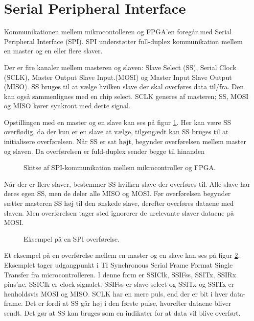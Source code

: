 \section{Serial Peripheral Interface}
\label{app:spi}
Kommunikationen mellem mikrocontolleren og FPGA’en foregår med Serial Peripheral Interface (SPI). 
SPI understøtter full-duplex kommunikation mellem en master og en eller flere slaver.

Der er fire kanaler mellem masteren og slaven: Slave Select (SS), Serial Clock (SCLK), Master Output Slave Input.(MOSI) og Master Input Slave Output (MISO). SS bruges til at vælge hvilken slave der skal overføres data til/fra. Den kan også sammenlignes med en chip select. SCLK generes af masteren; SS, MOSI og MISO kører synkront med dette signal.

Opstillingen med en master og en slave kan ses på figur \ref{fig:SPImasterslave}. 
Her kan være SS overflødig, da der kun er en slave at vælge, tilgengædt kan SS bruges til at initialisere overførelsen. 
Når SS er sat højt, begynder overførelsen mellem master og slaven. Da overførelsen er fuld-duplex sender begge til hinanden 
\begin{figure}[!th]
\centering
\begin{tikzpicture}[scale=0.8]

\end{tikzpicture}
\caption[SPI protokol]{Skitse af SPI-kommunikation mellem mikrocontroller og FPGA.}
\label{fig:SPImasterslave}
\end{figure}

Når der er flere slaver, bestemmer SS hvilken slave der overføres til.
Alle slave har deres egen SS, men de deler alle MISO og MOSI. 
Før overførelsen begynder sætter masteren SS høj til den ønskede slave,
derefter overføres dataene med slaven.
Men overførelsen tager sted ignorerer de urelevante slaver dataene på MOSI.  



\begin{figure}[!th]
\centering
\begin{tikzpicture}[scale=0.8]

\end{tikzpicture}
\caption[SPI overførelse]{Eksempel på en SPI overførelse.}
\label{fig:SPIfigur}
\end{figure}

Et eksempel på en overførelse mellem en master og en slave kan ses på figur \ref{fig:SPIfigur}. 
Eksemplet tager udgangpunkt i TI Synchronous Serial Frame Format Single Transfer \cite[s. 476]{lm3s6965} fra microcontrolleren.
I denne form er SSIClk, SSIFss, SSITx, SSIRx pins'ne. SSIClk er clock signalet, SSIFss er slave select og SSITx og SSITx er henholdsvis MOSI og MISO.
SCLK har en mere puls, end der er bit i hver data-frame. Det er fordi at SS går høj i den første pulse, hvorefter dataene bliver sendt. 
Det gør at SS kan bruges som en indikater for at data vil blive overført.
   


